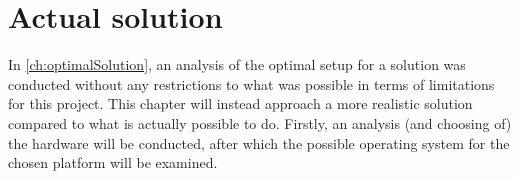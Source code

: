 \chapter{Actual solution}
In \autoref{ch:optimalSolution}, an analysis of the optimal setup for a solution was conducted without any restrictions to what was possible in terms of limitations for this project. This chapter will instead approach a more realistic solution compared to what is actually possible to do. Firstly, an analysis (and choosing of) the hardware will be conducted, after which the possible operating system for the chosen platform will be examined.
